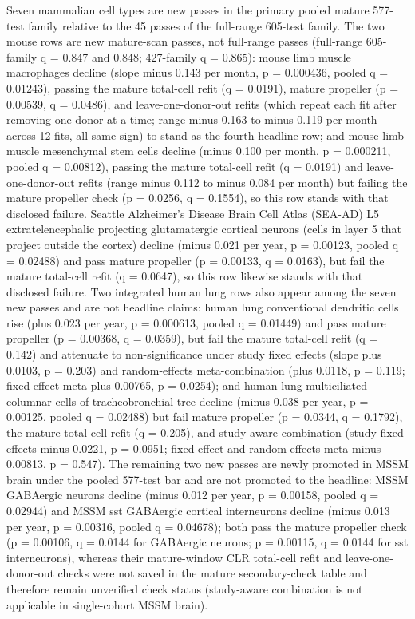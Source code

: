\documentclass[11pt]{article}
\begin{document}
Seven mammalian cell types are new passes in the primary pooled mature 577-test family relative to the 45 passes of the full-range 605-test family. The two mouse rows are new mature-scan passes, not full-range passes (full-range 605-family q = 0.847 and 0.848; 427-family q = 0.865): mouse limb muscle macrophages decline (slope minus 0.143 per month, p = 0.000436, pooled q = 0.01243), passing the mature total-cell refit (q = 0.0191), mature propeller (p = 0.00539, q = 0.0486), and leave-one-donor-out refits (which repeat each fit after removing one donor at a time; range minus 0.163 to minus 0.119 per month across 12 fits, all same sign) to stand as the fourth headline row; and mouse limb muscle mesenchymal stem cells decline (minus 0.100 per month, p = 0.000211, pooled q = 0.00812), passing the mature total-cell refit (q = 0.0191) and leave-one-donor-out refits (range minus 0.112 to minus 0.084 per month) but failing the mature propeller check (p = 0.0256, q = 0.1554), so this row stands with that disclosed failure. Seattle Alzheimer's Disease Brain Cell Atlas (SEA-AD) L5 extratelencephalic projecting glutamatergic cortical neurons (cells in layer 5 that project outside the cortex) decline (minus 0.021 per year, p = 0.00123, pooled q = 0.02488) and pass mature propeller (p = 0.00133, q = 0.0163), but fail the mature total-cell refit (q = 0.0647), so this row likewise stands with that disclosed failure. Two integrated human lung rows also appear among the seven new passes and are not headline claims: human lung conventional dendritic cells rise (plus 0.023 per year, p = 0.000613, pooled q = 0.01449) and pass mature propeller (p = 0.00368, q = 0.0359), but fail the mature total-cell refit (q = 0.142) and attenuate to non-significance under study fixed effects (slope plus 0.0103, p = 0.203) and random-effects meta-combination (plus 0.0118, p = 0.119; fixed-effect meta plus 0.00765, p = 0.0254); and human lung multiciliated columnar cells of tracheobronchial tree decline (minus 0.038 per year, p = 0.00125, pooled q = 0.02488) but fail mature propeller (p = 0.0344, q = 0.1792), the mature total-cell refit (q = 0.205), and study-aware combination (study fixed effects minus 0.0221, p = 0.0951; fixed-effect and random-effects meta minus 0.00813, p = 0.547). The remaining two new passes are newly promoted in MSSM brain under the pooled 577-test bar and are not promoted to the headline: MSSM GABAergic neurons decline (minus 0.012 per year, p = 0.00158, pooled q = 0.02944) and MSSM sst GABAergic cortical interneurons decline (minus 0.013 per year, p = 0.00316, pooled q = 0.04678); both pass the mature propeller check (p = 0.00106, q = 0.0144 for GABAergic neurons; p = 0.00115, q = 0.0144 for sst interneurons), whereas their mature-window CLR total-cell refit and leave-one-donor-out checks were not saved in the mature secondary-check table and therefore remain unverified check status (study-aware combination is not applicable in single-cohort MSSM brain).
\end{document}
